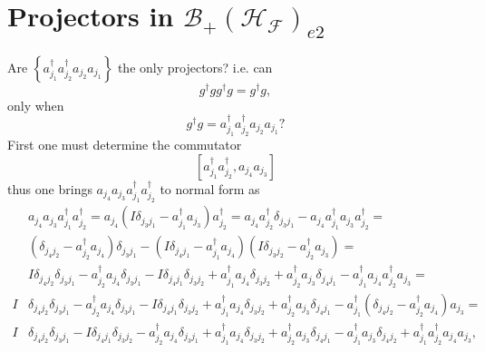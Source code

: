 \documentclass[aps,preprint]{revtex4}%
\begin{document}
\section{Projectors in $\mathcal{B}_{+}\left(  \mathcal{H}_{\mathcal{F}%
}\right)  _{e2}$}

Are $\left\{  a_{j_{1}}^{\dagger}a_{j_{2}}^{\dagger}a_{j_{2}}a_{j_{1}%
}\right\}  $ the only projectors? i.e. can
\begin{equation}
g^{\dagger}gg^{\dagger}g=g^{\dagger}g,
\end{equation}
only when
\begin{equation}
g^{\dagger}g=a_{j_{1}}^{\dagger}a_{j_{2}}^{\dagger}a_{j_{2}}a_{j_{1}}?
\end{equation}
First one must determine the commutator%
\begin{equation}
\left[  a_{j_{1}}^{\dagger}a_{j_{2}}^{\dagger},a_{j_{4}}a_{j_{3}}\right]
\end{equation}
thus one brings $a_{j_{4}}a_{j_{3}}a_{j_{1}}^{\dagger}a_{j_{2}}^{\dagger}$ to
normal form as
\begin{align}
&  a_{j_{4}}a_{j_{3}}a_{j_{1}}^{\dagger}a_{j_{2}}^{\dagger}=a_{j_{4}}\left(
I\delta_{j_{3}j_{1}}-a_{j_{1}}^{\dagger}a_{j_{3}}\right)  a_{j_{2}}^{\dagger
}=a_{j_{4}}a_{j_{2}}^{\dagger}\delta_{j_{3}j_{1}}-a_{j_{4}}a_{j_{1}}^{\dagger
}a_{j_{3}}a_{j_{2}}^{\dagger}=\nonumber\\
&  \left(  \delta_{j_{4}j_{2}}-a_{j_{2}}^{\dagger}a_{j_{4}}\right)
\delta_{j_{3}j_{1}}-\left(  I\delta_{j_{4}j_{1}}-a_{j_{1}}^{\dagger}a_{j_{4}%
}\right)  \left(  I\delta_{j_{3}j_{2}}-a_{j_{2}}^{\dagger}a_{j_{3}}\right)
=\nonumber\\
&  I\delta_{j_{4}j_{2}}\delta_{j_{3}j_{1}}-a_{j_{2}}^{\dagger}a_{j_{4}}%
\delta_{j_{3}j_{1}}-I\delta_{j_{4}j_{1}}\delta_{j_{3}j_{2}}+a_{j_{1}}%
^{\dagger}a_{j_{4}}\delta_{j_{3}j_{2}}+a_{j_{2}}^{\dagger}a_{j_{3}}%
\delta_{j_{4}j_{1}}-a_{j_{1}}^{\dagger}a_{j_{4}}a_{j_{2}}^{\dagger}a_{j_{3}%
}=\nonumber\\
I  &  \delta_{j_{4}j_{2}}\delta_{j_{3}j_{1}}-a_{j_{2}}^{\dagger}a_{j_{4}%
}\delta_{j_{3}j_{1}}-I\delta_{j_{4}j_{1}}\delta_{j_{3}j_{2}}+a_{j_{1}%
}^{\dagger}a_{j_{4}}\delta_{j_{3}j_{2}}+a_{j_{2}}^{\dagger}a_{j_{3}}%
\delta_{j_{4}j_{1}}-a_{j_{1}}^{\dagger}\left(  \delta_{j_{4}j_{2}}-a_{j_{2}%
}^{\dagger}a_{j_{4}}\right)  a_{j_{3}}=\nonumber\\
I  &  \delta_{j_{4}j_{2}}\delta_{j_{3}j_{1}}-I\delta_{j_{4}j_{1}}\delta
_{j_{3}j_{2}}-a_{j_{2}}^{\dagger}a_{j_{4}}\delta_{j_{3}j_{1}}+a_{j_{1}%
}^{\dagger}a_{j_{4}}\delta_{j_{3}j_{2}}+a_{j_{2}}^{\dagger}a_{j_{3}}%
\delta_{j_{4}j_{1}}-a_{j_{1}}^{\dagger}a_{j_{3}}\delta_{j_{4}j_{2}}+a_{j_{1}%
}^{\dagger}a_{j_{2}}^{\dagger}a_{j_{4}}a_{j_{3}},
\end{align}
\end{document}
